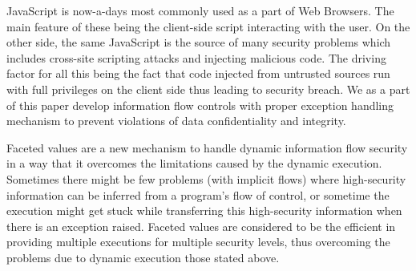 JavaScript is now-a-days most commonly used as a part of Web Browsers. The main feature of these being the client-side script interacting with the user. On the other side, the same JavaScript is the source of many security problems which includes cross-site scripting attacks and injecting malicious code. The driving factor for all this being the fact that code injected from untrusted sources run with full privileges on the client side thus leading to security breach. We as a part of this paper develop information flow controls with proper exception handling mechanism to prevent violations of data confidentiality and integrity.

Faceted values are a new mechanism to handle dynamic information flow security in a way that it overcomes the limitations caused by the dynamic execution. Sometimes there might be few problems (with implicit flows) where high-security information can be inferred from a program’s flow of control, or sometime the execution might get stuck while transferring this high-security information when there is an exception raised. Faceted values are considered to be the efficient in providing multiple executions for multiple security levels, thus overcoming the problems due to dynamic execution those stated above.

